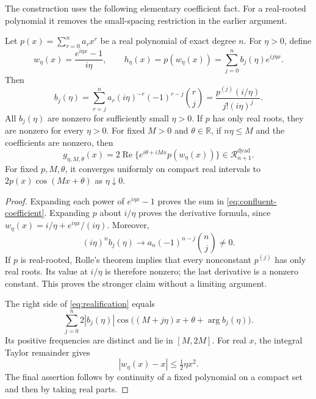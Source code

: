 The construction uses the following elementary coefficient fact.
For a real-rooted polynomial it removes the small-spacing restriction
in the earlier argument.

\begin{lemma}
\label{lem:confluent-real-rooted}
Let $p(x)=\sum_{r=0}^n a_rx^r$ be a real polynomial of exact degree $n$.
For $\eta>0$, define
\begin{equation}\label{eq:confluent-map}
 w_\eta(x)=\frac{e^{i\eta x}-1}{i\eta},\qquad
 h_\eta(x)=p(w_\eta(x))=\sum_{j=0}^n b_j(\eta)e^{ij\eta x}.
\end{equation}
Then
\begin{equation}\label{eq:confluent-coefficient}
 b_j(\eta)=\sum_{r=j}^n a_r(i\eta)^{-r}
 (-1)^{r-j}\binom rj
 =\frac{p^{(j)}(i/\eta)}{j!(i\eta)^j}.
\end{equation}
All $b_j(\eta)$ are nonzero for sufficiently small $\eta>0$.
If $p$ has only real roots, they are nonzero for every $\eta>0$.
For fixed $M>0$ and $\theta\in\mathbb R$, if $n\eta\le M$ and the
coefficients are nonzero, then
\begin{equation}\label{eq:realification}
 g_{\eta,M,\theta}(x)
 =2\operatorname{Re}\{e^{i\theta+iMx}p(w_\eta(x))\}
 \in\mathcal R_{n+1}^{\mathrm{dyad}}.
\end{equation}
For fixed $p,M,\theta$, it converges uniformly on compact real intervals
to $2p(x)\cos(Mx+\theta)$ as $\eta\downarrow0$.
\end{lemma}

\begin{proof}
Expanding each power of $e^{i\eta x}-1$ proves the sum in
\eqref{eq:confluent-coefficient}. Expanding $p$ about $i/\eta$ proves
the derivative formula, since $w_\eta(x)=i/\eta+e^{i\eta x}/(i\eta)$.
Moreover,
\[
 (i\eta)^n b_j(\eta)\longrightarrow
 a_n(-1)^{n-j}\binom nj\ne0.
\]
If $p$ is real-rooted, Rolle's theorem implies that every nonconstant
$p^{(j)}$ has only real roots. Its value at $i/\eta$ is therefore nonzero;
the last derivative is a nonzero constant. This proves the stronger
claim without a limiting argument.

The right side of \eqref{eq:realification} equals
\[
 \sum_{j=0}^n2|b_j(\eta)|
 \cos\big((M+j\eta)x+\theta+\arg b_j(\eta)\big).
\]
Its positive frequencies are distinct and lie in $[M,2M]$.
For real $x$, the integral Taylor remainder gives
\begin{equation}\label{eq:confluence-error-elementary}
 |w_\eta(x)-x|\le\tfrac12\eta x^2.
\end{equation}
The final assertion follows by continuity of a fixed polynomial on a
compact set and then by taking real parts.
\end{proof}

